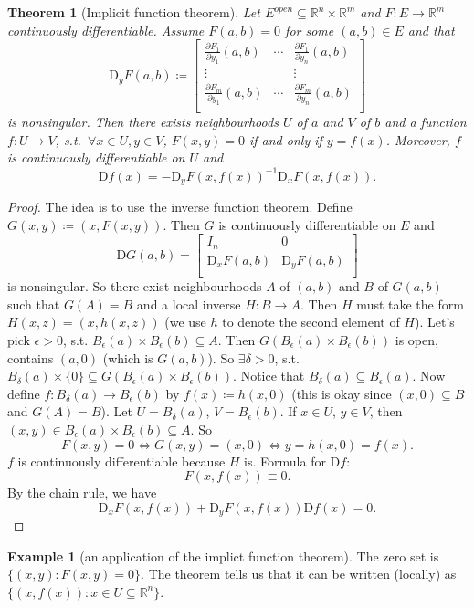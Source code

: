 \documentclass[12pt]{article}
\theoremstyle{plain}
\newtheorem{thm}{Theorem}
\theoremstyle{definition}
\newtheorem*{eg}{Example}
\begin{document}
\begin{thm}[Implicit function theorem]
    Let $E^{open}\subseteq \mathbb{R}^n\times \mathbb{R}^m$ and $F:E\rightarrow\mathbb{R}^m$ continuously differentiable.
    Assume $F(a,b) = 0$ for some $(a,b)\in E$ and that
    \[
        \mathrm{D}_y F(a,b)\coloneqq
        \begin{bmatrix}
            \frac{\partial F_1}{\partial y_1}(a,b)&\cdots&\frac{\partial F_1}{\partial y_n}(a,b)\\
            \vdots&&\vdots\\
            \frac{\partial F_m}{\partial y_1}(a,b)&\cdots&\frac{\partial F_m}{\partial y_n}(a,b)\\
        \end{bmatrix}
    \]
    is nonsingular.
    Then there exists neighbourhoods $U$ of $a$ and $V$ of $b$ and a function $f:U\rightarrow V$, s.t.\ $\forall x\in U, y\in V$, $F(x,y) = 0$ if and
    only if $y=f(x)$.
    Moreover, $f$ is continuously differentiable on $U$ and
    \[
        \mathrm{D}f(x) = -\mathrm{D}_yF(x,f(x))^{-1}\mathrm{D}_xF(x,f(x)).
    \]
\end{thm}
\begin{proof}
    The idea is to use the inverse function theorem.
    Define $G(x,y) \coloneqq (x,F(x,y))$.
    Then $G$ is continuously differentiable on $E$ and
    \[
        \mathrm{D}G(a,b)=\begin{bmatrix}
            I_n & 0\\
            \mathrm{D}_xF(a,b)&\mathrm{D}_y F(a,b)\\
        \end{bmatrix}
    \]
    is nonsingular.
    So there exist neighbourhoods $A$ of $(a,b)$ and $B$ of $G(a,b)$ such that 
    $G(A) = B$ and a local inverse $H:B\rightarrow A$.
    Then $H$ must take the form
    $H(x,z) = (x,h(x,z))$ (we use $h$ to denote the second element of $H$).
    Let's pick $\epsilon>0$, s.t. $B_\epsilon(a)\times B_\epsilon(b)\subseteq A$.
    Then $G(B_\epsilon(a)\times B_\epsilon(b))$ is open, contains $(a,0)$ (which is $G(a,b)$).
    So $\exists \delta>0$, s.t.\ $B_\delta(a)\times\{0\}\subseteq G(B_\epsilon(a)\times B_\epsilon(b))$.
    Notice that $B_\delta(a)\subseteq B_\epsilon(a)$.
    Now define $f:B_\delta(a)\rightarrow B_\epsilon(b)$ by $f(x)\coloneqq h(x,0)$ (this is okay since $(x,0)\subseteq B$ and $G(A)=B$).
    Let $U=B_\delta (a)$, $V=B_\epsilon(b)$.
    If $x\in U$, $y\in V$, then $(x,y)\in B_\epsilon(a)\times B_\epsilon(b)\subseteq A$.
    So 
    \[
        F(x,y) = 0\Longleftrightarrow G(x,y) = (x,0) \Longleftrightarrow y=h(x,0)=f(x).
    \]
    $f$ is continuously differentiable because $H$ is.
    Formula for $\mathrm{D}f$:
    \[
        F(x,f(x)) \equiv 0.
    \]
    By the chain rule, we have
    \[
        \mathrm{D}_x F(x,f(x)) + \mathrm{D}_y F(x,f(x))\mathrm{D}f(x) = 0.
    \]
\end{proof}

\begin{eg}[an application of the implict function theorem]
    The zero set is $\{(x,y):F(x,y) = 0\}$.
    The theorem tells us that it can be written (locally) as $\{(x,f(x)):x\in U\subseteq \mathbb{R}^n\}$.
\end{eg}
\end{document}
